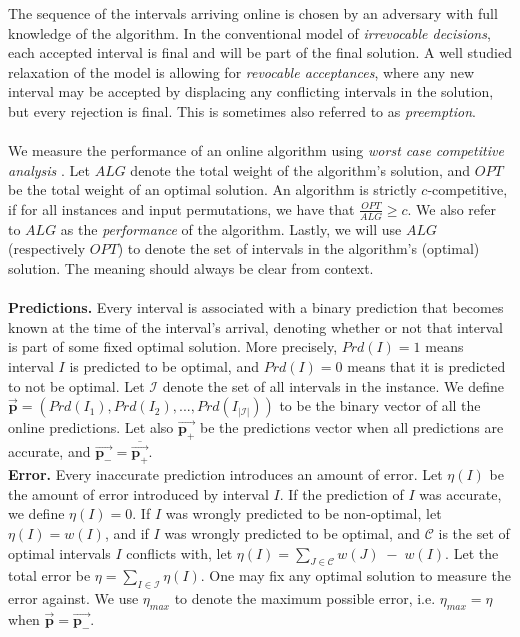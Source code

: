 The sequence of the intervals arriving online is chosen by an adversary with full knowledge of the algorithm. In the conventional model of \textit{irrevocable decisions}, each accepted interval is final and will be part of the final solution. A well studied relaxation of the model is allowing for \textit{revocable acceptances}, where any new interval may be accepted by displacing any conflicting intervals in the solution, but every rejection is final. This is sometimes also referred to as \textit{preemption}.\\\\
We measure the performance of an online algorithm using \textit{worst case competitive analysis} \cite{BorOnlineBook}. Let $ALG$ denote the total weight of the algorithm's solution, and $OPT$ be the total weight of an optimal solution. An algorithm is strictly $c$-competitive, if for all instances and input permutations, we have that $\frac{OPT}{ALG}\geq c$. We also refer to $ALG$ as the \textit{performance} of the algorithm. Lastly, we will use $ALG$ (respectively $OPT$) to denote the set of intervals in the algorithm's (optimal) solution. The meaning should always be clear from context.\\\\
\textbf{Predictions.} Every interval is associated with a binary prediction that becomes known at the time of the interval's arrival, denoting whether or not that interval is part of some fixed optimal solution. More precisely, $Prd(I)=1$ means interval $I$ is predicted to be optimal, and $Prd(I)=0$ means that it is predicted to not be optimal. Let $\mathcal{I}$ denote the set of all intervals in the instance. We define $\overrightarrow{\textbf{p}} = (Prd(I_1),Prd(I_2),...,Prd(I_{|\mathcal{I}|}))$ to be the binary vector of all the online predictions. Let also $\overrightarrow{\textbf{p}_{+}}$ be the predictions vector when all predictions are accurate, and $\overrightarrow{\textbf{p}_{-}}= \overline{\overrightarrow{\textbf{p}_{+}}}$.\\
\textbf{Error.} Every inaccurate prediction introduces an amount of error. Let $\eta(I)$ be the amount of error introduced by interval $I$. If the prediction of $I$ was accurate, we define $\eta(I)=0$. If $I$ was wrongly predicted to be non-optimal, let $\eta(I) = w(I)$, and if $I$ was wrongly predicted to be optimal, and $\mathcal{C}$ is the set of optimal intervals $I$ conflicts with, let $\eta(I) =\sum_{J\in \mathcal{C}}w(J)\;-\;w(I)$. Let the total error be $\eta = \sum_{I\in\mathcal{I}}\eta(I)$. One may fix any optimal solution to measure the error against. We use $\eta_{max}$ to denote the maximum possible error, i.e. $\eta_{max}=\eta$ when $\overrightarrow{\textbf{p}} = \overrightarrow{\textbf{p}_{-}}$.\\\\
